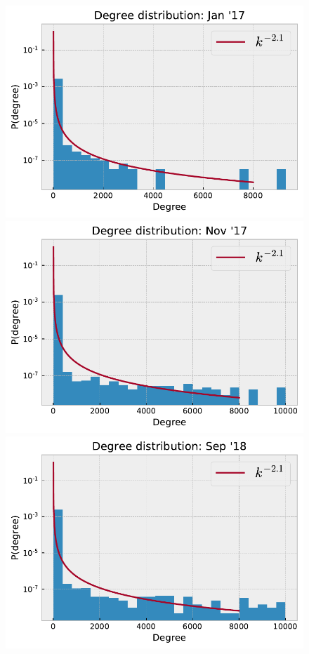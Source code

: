\documentclass[10pt,a4paper]{article}
\begin{document}
\begin{multicols}{2}
\begin{figure}[!ht]
\centering
\begin{minipage}[t]{.33\textwidth}
\includegraphics[scale=0.4]{figures/degree_dist_jan_17.pdf}
\end{minipage}%
\begin{minipage}[t]{.33\textwidth}
\includegraphics[scale=0.4]{figures/degree_dist_nov_17.pdf}
\end{minipage}
\begin{minipage}[t]{.33\textwidth}
\includegraphics[scale=0.4]{figures/degree_dist_sep_18.pdf}

\end{minipage}
\end{figure}
\end{multicols}
\end{document}
